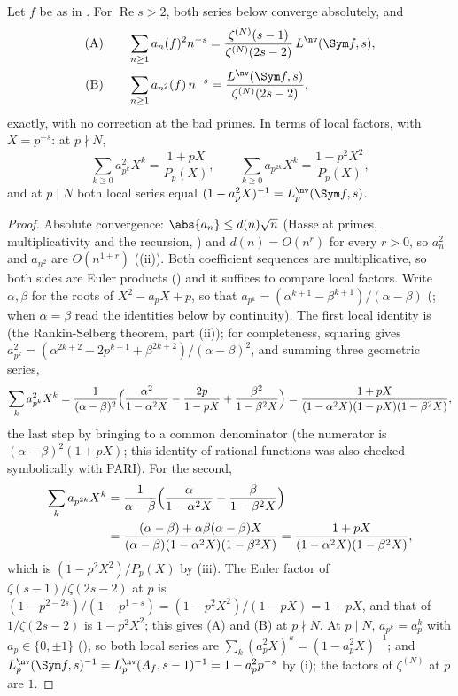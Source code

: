 \begin{proposition}\label{prop:lfunctions:rankin-series}
Let $f$ be as in . For $\operatorname{Re}s>2$, both series below converge absolutely, and
\begin{align*}
\text{(A)}&\qquad\sum_{n\ge1}a_n(f)^2n^{-s}=\frac{\zeta^{(N)}(s-1)}{\zeta^{(N)}(2s-2)}\,L^{\nv}(\Sym f,s),\\
\text{(B)}&\qquad\sum_{n\ge1}a_{n^2}(f)\,n^{-s}=\frac{L^{\nv}(\Sym f,s)}{\zeta^{(N)}(2s-2)},
\end{align*}
exactly, with no correction at the bad primes. In terms of local factors, with $X=p^{-s}$: at $p\nmid N$,
\[
\sum_{k\ge0}a_{p^k}^2X^k=\frac{1+pX}{P_p(X)},\qquad\sum_{k\ge0}a_{p^{2k}}X^k=\frac{1-p^2X^2}{P_p(X)},
\]
and at $p\mid N$ both local series equal $(1-a_p^2X)^{-1}=L_p^{\nv}(\Sym f,s)$.
\end{proposition}

\begin{proof}
Absolute convergence: $\abs{a_n}\le d(n)\sqrt n$ (Hasse at primes, multiplicativity and the recursion, ) and $d(n)=O(n^r)$ for every $r>0$, so
$a_n^2$ and $a_{n^2}$ are $O(n^{1+r})$ ((ii)). Both coefficient sequences are multiplicative, so both sides are Euler products
() and it suffices to compare local factors. Write $\alpha,\beta$ for the roots of $X^2-a_pX+p$, so that
$a_{p^k}=(\alpha^{k+1}-\beta^{k+1})/(\alpha-\beta)$ (; when $\alpha=\beta$ read the identities below by continuity). The first local identity is  (the
Rankin-Selberg theorem, part (ii)); for completeness, squaring gives $a_{p^k}^2=(\alpha^{2k+2}-2p^{k+1}+\beta^{2k+2})/(\alpha-\beta)^2$, and summing three geometric series,
\[
\sum_ka_{p^k}^2X^k=\frac1{(\alpha-\beta)^2}\Bigl(\frac{\alpha^2}{1-\alpha^2X}-\frac{2p}{1-pX}+\frac{\beta^2}{1-\beta^2X}\Bigr)=\frac{1+pX}{(1-\alpha^2X)(1-pX)(1-\beta^2X)},
\]
the last step by bringing to a common denominator (the numerator is $(\alpha-\beta)^2(1+pX)$; this identity of rational functions was also checked symbolically with PARI).
For the second,
\begin{align*}
\sum_ka_{p^{2k}}X^k&=\frac1{\alpha-\beta}\Bigl(\frac\alpha{1-\alpha^2X}-\frac\beta{1-\beta^2X}\Bigr)\\
&=\frac{(\alpha-\beta)+\alpha\beta(\alpha-\beta)X}{(\alpha-\beta)(1-\alpha^2X)(1-\beta^2X)}=\frac{1+pX}{(1-\alpha^2X)(1-\beta^2X)},
\end{align*}
which is $(1-p^2X^2)/P_p(X)$ by (iii). The Euler factor of $\zeta(s-1)/\zeta(2s-2)$ at $p$ is $(1-p^{2-2s})/(1-p^{1-s})=(1-p^2X^2)/(1-pX)=1+pX$, and that of
$1/\zeta(2s-2)$ is $1-p^2X^2$; this gives (A) and (B) at $p\nmid N$. At $p\mid N$, $a_{p^k}=a_p^k$ with $a_p\in\{0,\pm1\}$ (), so both local series are
$\sum_k(a_p^2X)^k=(1-a_p^2X)^{-1}$; and $L_p^{\nv}(\Sym f,s)^{-1}=L_p^{\nv}(A_f,s-1)^{-1}=1-a_p^2p^{-s}$ by (i); the factors of $\zeta^{(N)}$ at $p$ are $1$.
\end{proof}

